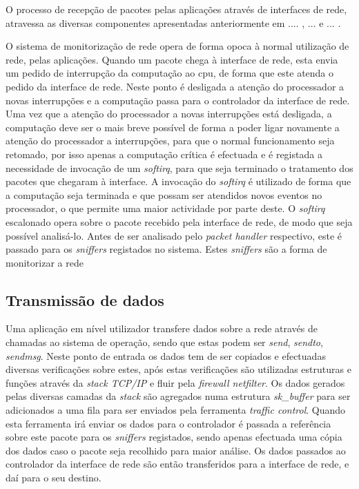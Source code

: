 O processo de recepção de pacotes pelas aplicações através de interfaces de rede, atravessa as diversas componentes apresentadas anteriormente em .... , ... e ... .

O sistema de monitorização de rede opera de forma opoca à normal utilização de rede, pelas aplicações.
Quando um pacote chega à interface de rede, esta envia um pedido de interrupção da computação ao cpu, de forma que este atenda o pedido da interface de rede.
Neste ponto é desligada a atenção do processador a novas interrupções e a computação passa para o controlador da interface de rede.
Uma vez que a atenção do processador a novas interrupções está desligada, a computação deve ser o mais breve possível de forma a poder ligar novamente a atenção do processador a interrupções, para que o normal funcionamento seja retomado, por isso apenas a computação crítica é efectuada e é registada a necessidade de invocação de um \textit{softirq}, para que seja terminado o tratamento dos pacotes que chegaram à interface.
A invocação do \textit{softirq} é utilizado de forma que a computação seja terminada e que possam ser atendidos novos eventos no processador, o que permite uma maior actividade por parte deste.
O \textit{softirq} escalonado opera sobre o pacote recebido pela interface de rede, de modo que seja possível analisá-lo.
Antes de ser analisado pelo \textit{packet handler} respectivo, este é passado para os \textit{sniffers} registados no sistema.
Estes \textit{sniffers} são a forma de monitorizar a rede

\subsection{Transmissão de dados}

Uma aplicação em nível utilizador transfere dados sobre a rede através de chamadas ao sistema de operação, sendo que estas podem ser \textit{send}, \textit{sendto}, \textit{sendmsg}.
 Neste ponto de entrada os dados tem de ser copiados e efectuadas diversas verificações sobre estes, após estas verificações são utilizadas estruturas e funções através da \textit{stack TCP/IP} e fluir pela \textit{firewall netfilter}.
 Os dados gerados pelas diversas camadas da \textit{stack} são agregados numa estrutura \textit{sk\_buffer} para ser adicionados a uma fila para ser enviados pela ferramenta \textit{traffic control}.
 Quando esta ferramenta irá enviar os dados para o controlador é passada a referência sobre este pacote para os \textit{sniffers} registados, sendo apenas efectuada uma cópia dos dados caso o pacote seja recolhido para maior análise. Os dados passados ao controlador da interface de rede são então transferidos para a interface de rede, e daí para o seu destino.


